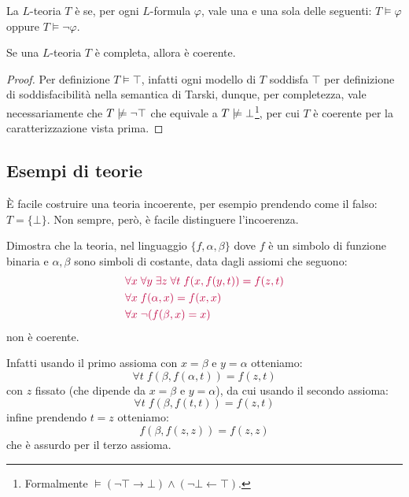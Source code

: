 \begin{definition}[Completezza]
    La $L$-teoria $T$ è  se, per ogni $L$-formula  $\varphi$, vale una e una sola delle seguenti: $T \models \varphi$ oppure $T \models \neg \varphi$.
\end{definition}

\begin{remark}
    Se una $L$-teoria $T$ è completa, allora è coerente.
\end{remark}

\begin{proof}
    Per definizione $T \models \top$, infatti ogni modello di $T$ soddisfa $\top$ per definizione di soddisfacibilità nella semantica di Tarski, dunque, per completezza, vale necessariamente che $T \nmodels \neg \top$ che equivale a $T \nmodels \bot$\footnote{Formalmente $\models (\neg \top \to \bot) \land (\neg \bot \gets \top)$.},
    per cui $T$ è coerente per la caratterizzazione vista prima.
\end{proof}

\subsection{Esempi di teorie}
È facile costruire una teoria incoerente, per esempio prendendo come  il falso: $T = \{\bot\}$. Non sempre, però, è facile distinguere l'incoerenza.

\begin{exercise}
    Dimostra che la teoria, nel linguaggio $\{f,\alpha, \beta\}$ dove $f$ è un simbolo di funzione binaria e $\alpha,\beta$ sono simboli di costante, data dagli assiomi che seguono:
    \begin{align*}
        & \textcolor{purple}{\forall x \; \forall y \; \exists z \; \forall t \; f(x,f(y,t)) = f(z,t)} \\
        & \textcolor{purple}{\forall x \; f(\alpha,x) = f(x,x)} \\
        & \textcolor{purple}{\forall x \; \neg (f(\beta,x) = x)}
    \end{align*}
    non è coerente.
\end{exercise}

\begin{soln}
    Infatti usando il primo assioma con $x = \beta$ e $y = \alpha$ otteniamo:
    \[ \forall t \; f(\beta,f(\alpha,t)) = f(z,t) \]
    con $z$ fissato (che dipende da $x = \beta$ e $y = \alpha$), da cui usando il secondo assioma:
    \[ \forall t \; f(\beta,f(t,t)) = f(z,t) \]
    infine prendendo $t = z$ otteniamo:
    \[ f(\beta,f(z,z)) = f(z,z) \]
    che è assurdo per il terzo assioma.
\end{soln}

